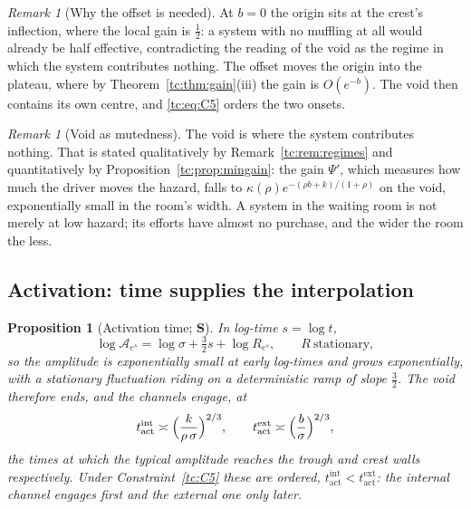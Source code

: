 \documentclass[11pt]{article}
\numberwithin{equation}{section}
\theoremstyle{plain}
\newtheorem{proposition}[theorem]{Proposition}
\theoremstyle{definition}
\theoremstyle{remark}
\newtheorem{remark}[theorem]{Remark}
\newcommand{\Ac}{\mathcal{A}}
\begin{document}
\begin{remark}[Why the offset is needed]\label{tc:rem:whyoffset}
At $b=0$ the origin sits at the crest's inflection, where the local gain
is $\tfrac12$: a system with no muffling at all would already be half
effective, contradicting the reading of the void as the regime in which
the system contributes nothing. The offset moves the origin into the
plateau, where by Theorem~\ref{tc:thm:gain}(iii) the gain is $O(e^{-b})$.
The void then contains its own centre, and \eqref{tc:eq:C5} orders the
two onsets.
\end{remark}

\begin{remark}[Void as mutedness]\label{tc:rem:mutedness}
The void is where the system contributes nothing. That is stated
qualitatively by Remark~\ref{tc:rem:regimes} and quantitatively by
Proposition~\ref{tc:prop:mingain}: the gain $\Psi'$, which measures how
much the driver moves the hazard, falls to
$\kappa(\rho)e^{-(\rho b+k)/(1+\rho)}$ on the void, exponentially small
in the room's width. A system in the waiting room is not merely at low hazard;
its efforts have almost no purchase, and the wider the room the less.
\end{remark}

\subsection{Activation: time supplies the interpolation}
\label{tc:subsub:activation}

\begin{proposition}[Activation time; \textbf{S}]\label{tc:prop:tact}
In log-time $s=\log t$,
\begin{equation}\label{tc:eq:logamp}
\log\Ac_{e^{s}}=\log\sigma+\tfrac32s+\log R_{e^{s}},
\qquad R\ \text{stationary},
\end{equation}
so the amplitude is exponentially small at early log-times and grows
exponentially, with a stationary fluctuation riding on a deterministic
ramp of slope $\tfrac32$. The void therefore ends, and the channels
engage, at
\begin{equation}\label{tc:eq:tact}
t^{\mathrm{int}}_{\mathrm{act}}\asymp\Bigl(\frac{k}{\rho\,\sigma}
\Bigr)^{2/3},
\qquad
t^{\mathrm{ext}}_{\mathrm{act}}\asymp\Bigl(\frac{b}{\sigma}\Bigr)^{2/3},
\end{equation}
the times at which the typical amplitude reaches the trough and crest
walls respectively. Under Constraint~\ref{tc:C5} these are ordered,
$t^{\mathrm{int}}_{\mathrm{act}}<t^{\mathrm{ext}}_{\mathrm{act}}$: the
internal channel engages first and the external one only later.
\end{proposition}
\end{document}
